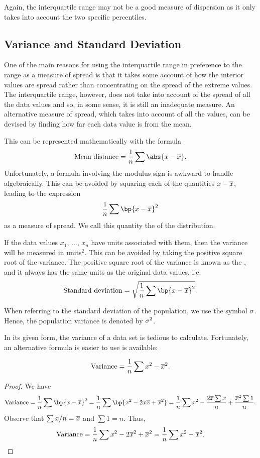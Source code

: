 Again, the interquartile range may not be a good measure of dispersion as it only takes into account the two specific percentiles.

\subsection{Variance and Standard Deviation}

One of the main reasons for using the interquartile range in preference to the range as a measure of spread is that it takes some account of how the interior values are spread rather than concentrating on the spread of the extreme values. The interquartile range, however, does not take into account of the spread of all the data values and so, in some sense, it is still an inadequate measure. An alternative measure of spread, which takes into account of all the values, can be devised by finding how far each data value is from the mean.

This can be represented mathematically with the formula \[\text{Mean distance} = \frac1n \sum \abs{x - \ol x}.\] Unfortunately, a formula involving the modulus sign is awkward to handle algebraically. This can be avoided by squaring each of the quantities $x - \overline{x}$, leading to the expression \[\frac1n \sum \bp{x - \ol x}^2\] as a measure of spread. We call this quantity the  of the distribution.

If the data values $x_1$, $\dots$, $x_n$ have units associated with them, then the variance will be measured in units$^2$. This can be avoided by taking the positive square root of the variance. The positive square root of the variance is known as the , and it always has the same units as the original data values, i.e. \[\text{Standard deviation} = \sqrt{\frac1n \sum \bp{x - \ol x}^2}.\]

When referring to the standard deviation of the population, we use the symbol $\sigma$. Hence, the population variance is denoted by $\sigma^2$.

In its given form, the variance of a data set is tedious to calculate. Fortunately, an alternative formula is easier to use is available:

\begin{proposition}
    \[\text{Variance} = \frac1n \sum x^2 - \overline{x}^2.\]
\end{proposition}
\begin{proof}
    We have \[\text{Variance} = \frac1n \sum \bp{x - \ol x}^2 = \frac1n \sum \bp{x^2 - 2x \ol{x} + \ol{x}^2} = \frac1n \sum x^2 - \frac{2\ol{x} \sum x}{n} + \frac{\ol{x}^2 \sum 1}{n}.\] Observe that $\sum x/n = \overline{x}$ and $\sum 1 = n$. Thus, \[\text{Variance} = \frac1n \sum x^2 - 2\overline{x}^2 + \overline{x}^2 = \frac1n \sum x^2 - \overline{x}^2.\]
\end{proof}